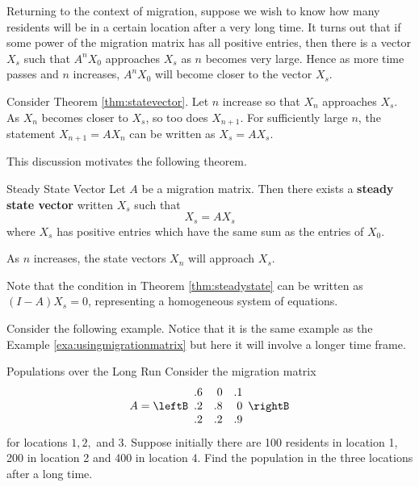 Returning to the context of migration, suppose we wish to know how many residents will be in a certain location
after a very long time. It turns out that if some power of the
migration matrix has all positive entries, then there is a vector $X_s$ such that $A^{n}X_{0}$ approaches $X_s$ as $n$ becomes very large. Hence as more time passes and $n$ increases, $A^{n}X_{0}$ will become closer to the vector $X_s$. 

Consider Theorem \ref{thm:statevector}. Let $n$ increase so that $X_n$ approaches $X_s$. As $X_n$ becomes closer to $X_s$, so too does $X_{n+1}$. For sufficiently large $n$, the statement $X_{n+1} = AX_n$ can be written as $X_s = AX_s$. 

This discussion motivates the following theorem.

\begin{theorem}{Steady State Vector}\label{thm:steadystate}
Let $A$ be a migration matrix. Then there exists a \textbf{steady state vector} written $X_s$ such that 
\[
X_s = AX_s
\]
where $X_s$ has positive entries which have the same sum as the entries of $X_0$. 

As $n$ increases, the state vectors $X_n$ will approach $X_s$. 
\end{theorem}

Note that the condition in Theorem \ref{thm:steadystate} can be written as $(I - A)X_s=0$, representing a homogeneous system of equations. 

Consider the following example. Notice that it is the same example as the Example \ref{exa:usingmigrationmatrix} but here it will
involve a longer time frame.

\begin{example}{Populations over the Long Run}\label{exa:longrunpopulation}
Consider the migration matrix 
\begin{equation*}
A
=
\leftB
\begin{array}{rrr}
.6 & 0 & .1 \\
.2 & .8 & 0 \\
.2 & .2 & .9
\end{array}
\rightB 
\end{equation*}
 for locations $1,2,$ and $3.$ Suppose initially there are 100
residents in location 1, 200 in location 2 and 400 in location 4. Find the
population in the three locations after a long time.
\end{example}

